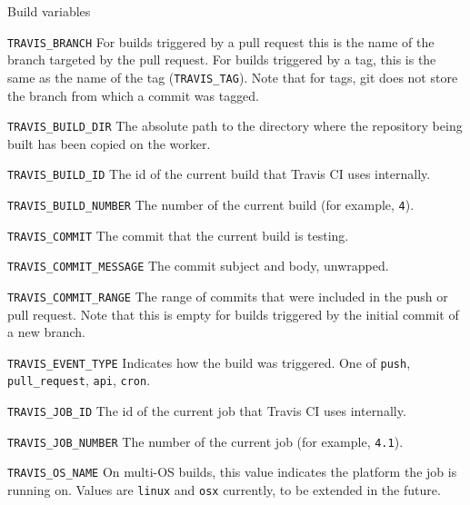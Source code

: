 \documentclass[presentation]{beamer}
\begin{document}
\begin{frame}[allowframebreaks]{Build variables}
\begin{block}{\texttt{TRAVIS\_BRANCH}}
        For builds triggered by a pull request this is the name of the branch targeted by the pull request.
        For builds triggered by a tag, this is the same as the name of the tag (\texttt{TRAVIS\_TAG}).
        Note that for tags, git does not store the branch from which a commit was tagged.
    \end{block}
    \begin{block}{\texttt{TRAVIS\_BUILD\_DIR}}
        The absolute path to the directory where the repository being built has been copied on the worker.
    \end{block}
    \begin{block}{\texttt{TRAVIS\_BUILD\_ID}}
        The id of the current build that Travis CI uses internally.
    \end{block}
    \begin{block}{\texttt{TRAVIS\_BUILD\_NUMBER}}
        The number of the current build (for example, \texttt{4}).
    \end{block}
    \begin{block}{\texttt{TRAVIS\_COMMIT}}
        The commit that the current build is testing.
    \end{block}
    \begin{block}{\texttt{TRAVIS\_COMMIT\_MESSAGE}}
        The commit subject and body, unwrapped.
    \end{block}
    \begin{block}{\texttt{TRAVIS\_COMMIT\_RANGE}}
        The range of commits that were included in the push or pull request. Note that this is empty for builds triggered by the initial commit of a new branch.
    \end{block}
    \begin{block}{\texttt{TRAVIS\_EVENT\_TYPE}}
        Indicates how the build was triggered. One of \texttt{push}, \texttt{pull\_request}, \texttt{api}, \texttt{cron}.
    \end{block}
    \begin{block}{\texttt{TRAVIS\_JOB\_ID}}
        The id of the current job that Travis CI uses internally.
    \end{block}
    \begin{block}{\texttt{TRAVIS\_JOB\_NUMBER}}
        The number of the current job (for example, \texttt{4.1}).
    \end{block}
    \begin{block}{\texttt{TRAVIS\_OS\_NAME}}
        On multi-OS builds, this value indicates the platform the job is running on. Values are \texttt{linux} and \texttt{osx} currently, to be extended in the future.

\end{block}
\end{frame}
\end{document}
